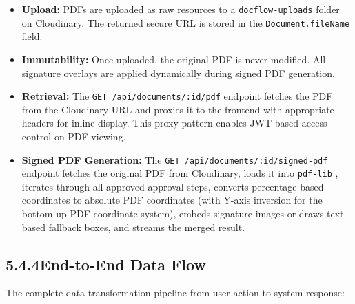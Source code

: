 \documentclass[12pt,a4paper]{report}
\newcommand{\citeref}[1]{%
  \textcolor{citeborder}{%
    \fboxsep=2pt%
    \fcolorbox{citeborder}{citebg}{\footnotesize\bfseries[#1]}%
  }%
}
\begin{document}
\begin{itemize}
    \item \textbf{Upload:} PDFs are uploaded as raw resources to a \texttt{docflow-uploads} folder on Cloudinary. The returned secure URL is stored in the \texttt{Document.fileName} field.
    \item \textbf{Immutability:} Once uploaded, the original PDF is never modified. All signature overlays are applied dynamically during signed PDF generation.
    \item \textbf{Retrieval:} The \texttt{GET /api/documents/:id/pdf} endpoint fetches the PDF from the Cloudinary URL and proxies it to the frontend with appropriate headers for inline display. This proxy pattern enables JWT-based access control on PDF viewing.
    \item \textbf{Signed PDF Generation:} The \texttt{GET /api/documents/:id/signed-pdf} endpoint fetches the original PDF from Cloudinary, loads it into \texttt{pdf-lib} \citeref{8}, iterates through all approved approval steps, converts percentage-based coordinates to absolute PDF coordinates (with Y-axis inversion for the bottom-up PDF coordinate system), embeds signature images or draws text-based fallback boxes, and streams the merged result.
\end{itemize}

\subsection*{5.4.4\quad End-to-End Data Flow}

The complete data transformation pipeline from user action to system response:
\end{document}
